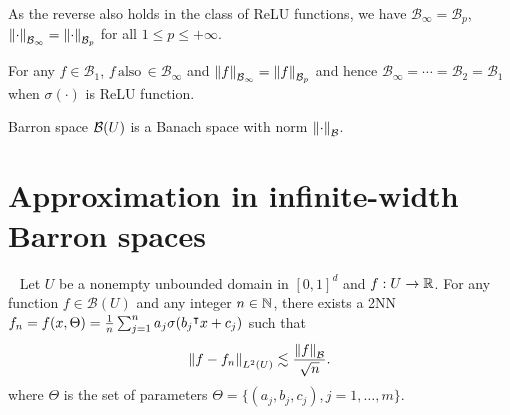 As the reverse also holds in the class of ReLU functions,  we have
$\mathcal{B}_{\infty} = \mathcal{B}_p$, $\left\| {\cdot} \right\|_{\mathcal{B}_{\infty}} =
    \left\| {\cdot} \right\|_{\mathcal{B}_{p}}$  for all $1 \leq p \leq +\infty$.

\begin{proposition}
    \label{prop:equivalence_barron_space}

    For any $f \in \mathcal{B}_1$, $f
        \,\text{also}\, \in \mathcal{B}_{\infty}$ and $\left\| {f} \right\|_{\mathcal{B}_{\infty}} =
        \left\| {f} \right\|_{\mathcal{B}_{p}}$ and hence $ \mathcal{B}_{\infty} = \cdots =
        \mathcal{B}_{2} = \mathcal{B}_1$ when $\sigma(\cdot)$ is ReLU function.
\end{proposition}

\begin{proposition}
    \label{prop:barron_space_is_banach}
    Barron space $\mathcal{B}(U)$ is a Banach space with norm
    $\left\| \cdot \right\|_{\mathcal{B}}$.
\end{proposition}


\section{Approximation in infinite-width Barron spaces}
\label{sec:approximation_in_infinite_width}

\begin{theorem} \
    \label{thm:barron_direct_appro_l2}
    Let $U$ be a nonempty unbounded domain in $[0,1]^d$ and $f: U \to \mathbb{R}$. For
    any function $f \in \mathcal{B}(U)$ and any integer $n \in \mathbb{N}$, there
    exists a 2NN $f_n = f(x, \Theta) = \frac{1}{n}\sum_{j=1}^n a_j \sigma(b_j{}^{\intercal}
    x + c_j)$ such that
    \begin{equation}
        \left\| f - f_n \right\|_{L^{2}(U)}\lesssim \frac{\left\| f \right\|_{\mathcal{B}}}{\sqrt{n}}.
    \end{equation}
    where $\Theta$ is the set of parameters $\Theta = \{(a_j, b_j, c_j),
    j=1,\dots,m\}$.

\end{theorem}


